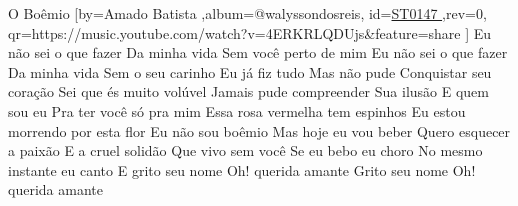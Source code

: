\beginsong
{O Boêmio %
}[by={Amado Batista %
},album={@walyssondosreis},
id={\href{https://music.youtube.com/watch?v=4ERKRLQDUjs&feature=share %
}{ST0147 %
}},rev={0}, %
qr={https://music.youtube.com/watch?v=4ERKRLQDUjs&feature=share %
}]
\beginverse
Eu não sei o que fazer
Da minha vida
Sem você perto de mim
Eu não sei o que fazer
Da minha vida
Sem o seu carinho
\endverse
\beginverse
Eu já fiz tudo
Mas não pude
Conquistar seu coração
Sei que és muito volúvel
Jamais pude compreender
Sua ilusão
\endverse
\beginverse
E quem sou eu
Pra ter você só pra mim
Essa rosa vermelha tem espinhos
Eu estou morrendo por esta flor
\endverse
\beginverse
Eu não sou boêmio
Mas hoje eu vou beber
Quero esquecer a paixão
E a cruel solidão
Que vivo sem você
\endverse
\beginverse
Se eu bebo eu choro
No mesmo instante eu canto
E grito seu nome
Oh! querida amante
\endverse
\beginverse
Grito seu nome
Oh! querida amante
\endverse
\vspace{4em} %
\begin{comment}
\lstset{basicstyle=\scriptsize\bf} %
\tab{Solo 1}
\begin{lstlisting}
E|-----------------------------------------------------|
B|-----------------------------------------------------|
G|-----------------------------------------------------|
D|-----------------------------------------------------|
A|-----------------------------------------------------|
E|-----------------------------------------------------|
\end{lstlisting}
\end{comment}
\begin{comment}

\color{drawChord}\gtab{\color{nameChord} X}{}%
\color{drawChord}\gtab{\color{nameChord} X}{}%
\color{drawChord}\gtab{\color{nameChord} X}{}%
\color{drawChord}\gtab{\color{nameChord} X}{}%

\end{comment}
